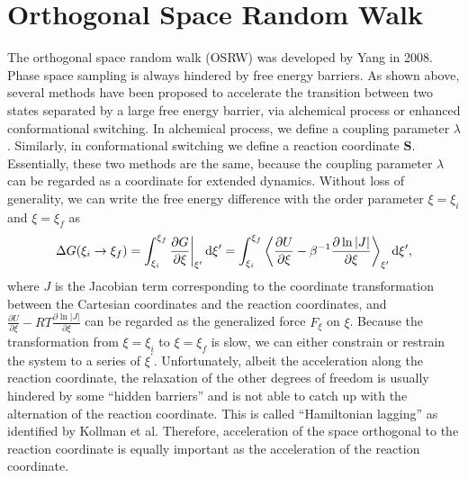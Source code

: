 \section{Orthogonal Space Random Walk\label{Sec:ES:OSRW}}
The orthogonal space random walk (OSRW) was developed by Yang in 2008.\cite{ZhengPNAS2008}
Phase space sampling is always hindered by free energy barriers. As shown above, several methods have been proposed to accelerate the transition between two states separated by a large free energy barrier, via alchemical process or enhanced conformational switching. In alchemical process, we define a coupling parameter $\lambda$. Similarly, in conformational switching we define a reaction coordinate $\mathbf{S}$. Essentially, these two methods are the same, because the coupling parameter $\lambda$ can be regarded as a coordinate for extended dynamics. Without loss of generality, we can write the free energy difference with the order parameter $\xi=\xi_i$ and $\xi=\xi_f$ as
\begin{equation}
	\Delta G(\xi_i \rightarrow \xi_f)=\int_{\xi_i}^{\xi_f}\frac{\partial G}{\partial \xi}\bigg\rvert_{\xi^\prime} \mathop{}\!\mathrm{d}\xi^\prime=\int_{\xi_i}^{\xi_f}\left<\frac{\partial U}{\partial \xi}-\beta^{-1}\frac{\partial \ln{|J|}}{\partial \xi}\right>_{\xi^\prime}\mathop{}\!\mathrm{d}\xi^\prime,
\end{equation}
where $J$ is the Jacobian term corresponding to the coordinate transformation between the Cartesian coordinates and the reaction coordinates, and $\frac{\partial U}{\partial \xi}-RT\frac{\partial \ln{|J|}}{\partial \xi}$ can be regarded as the generalized force $F_\xi$ on $\xi$. Because the transformation from $\xi=\xi_i$ to $\xi=\xi_f$ is slow, we can either constrain or restrain the system to a series of $\xi^\prime$. Unfortunately, albeit the acceleration along the reaction coordinate, the relaxation of the other degrees of freedom is usually hindered by some ``hidden barriers'' and is not able to catch up with the alternation of the reaction coordinate. This is called ``Hamiltonian lagging'' as identified by Kollman et al.\cite{PearlmanJCP1989} Therefore, acceleration of the space orthogonal to the reaction coordinate is equally important as the acceleration of the reaction coordinate.

